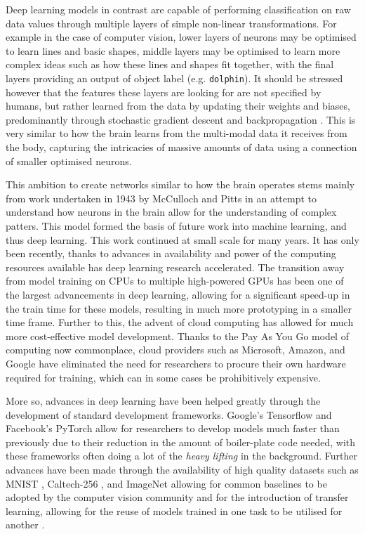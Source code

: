 Deep learning models in contrast are capable of performing classification on raw data values through multiple layers of simple non-linear transformations. For example in the case of computer vision, lower layers of neurons may be optimised to learn lines and basic shapes, middle layers may be optimised to learn more complex ideas such as how these lines and shapes fit together, with the final layers providing an output of object label (e.g. \texttt{dolphin}). It should be stressed however that the features these layers are looking for are not specified by humans, but rather learned from the data by updating their weights and biases, predominantly through stochastic gradient descent and backpropagation  \cite{hecht-nielsen_iii.3_1992}. This is very similar to how the brain learns from the multi-modal data it receives from the body, capturing the intricacies of massive amounts of data using a connection of smaller optimised neurons. 

This ambition to create networks similar to how the brain operates stems mainly from work undertaken in 1943 by McCulloch and Pitts \cite{mcculloch_logical_1943} in an attempt to understand how neurons in the brain allow for the understanding of complex patters. This model formed the basis of future work into machine learning, and thus deep learning. This work continued at small scale for many years. It has only been recently, thanks to advances in availability and power of the computing resources available has deep learning research accelerated. The transition away from model training on CPUs to multiple high-powered GPUs has been one of the largest advancements in deep learning, allowing for a significant speed-up in the train time for these models, resulting in much more prototyping in a smaller time frame. Further to this, the advent of cloud computing has allowed for much more cost-effective model development. Thanks to the Pay As You Go model of computing now commonplace, cloud providers such as Microsoft, Amazon, and Google have eliminated the need for researchers to procure their own hardware required for training, which can in some cases be prohibitively expensive. 

More so, advances in deep learning have been helped greatly through the development of standard development frameworks. Google's Tensorflow \cite{abadi_tensorflow:_2016} and Facebook's PyTorch \cite{paszke_automatic_2017} allow for researchers to develop models much faster than previously due to their reduction in the amount of boiler-plate code needed, with these frameworks often doing a lot of the \textit{heavy lifting} in the background. Further advances have been made through the availability of high quality datasets such as MNIST \cite{lecun_gradient-based_1998}, Caltech-256 \cite{griffin_caltech-256_2007}, and ImageNet \cite{deng_imagenet:_2009} allowing for common baselines to be adopted by the computer vision community and for the introduction of transfer learning, allowing for the reuse of models trained in one task to be utilised for another \cite{pan_survey_2010}.

